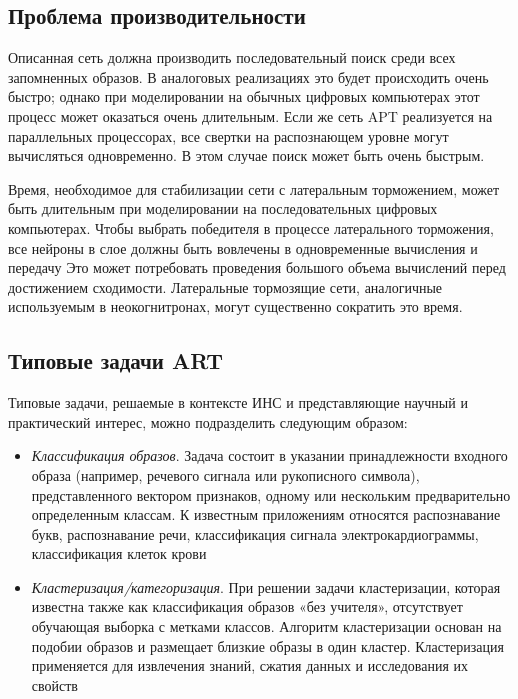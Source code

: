 \documentclass[14pt,a4paper,report]{article}
\begin{document}
\subsection{Проблема производительности}

Описанная сеть должна производить последовательный поиск среди всех запомненных образов. В аналоговых реализациях это будет происходить очень быстро; однако при моделировании на обычных цифровых компьютерах этот процесс может оказаться очень длительным. Если же сеть APT реализуется на параллельных процессорах, все свертки на распознающем уровне могут вычисляться одновременно. В этом случае поиск может быть очень быстрым.

Время, необходимое для стабилизации сети с латеральным торможением, может быть длительным при моделировании на последовательных цифровых компьютерах. Чтобы выбрать победителя в процессе латерального торможения, все нейроны в слое должны быть вовлечены в одновременные вычисления и передачу \cite{cite-scritub-adapt} Это может потребовать проведения большого объема вычислений перед достижением сходимости. Латеральные тормозящие сети, аналогичные используемым в неокогнитронах, могут существенно сократить это время.

\subsection{Типовые задачи ART}

Типовые задачи, решаемые в контексте ИНС и представляющие научный и практический интерес, можно подразделить следующим образом: 

\begin{itemize}
	\item \textit{Классификация образов}. Задача состоит в указании принадлежности входного образа (например, речевого сигнала или рукописного символа), представленного вектором признаков, одному или нескольким предварительно определенным классам. К известным приложениям относятся распознавание букв, распознавание речи, классификация сигнала электрокардиограммы, классификация клеток крови \cite{book-bikanov}
	
	\item \textit{Кластеризация/категоризация}. При решении задачи кластеризации, которая известна также как классификация образов «без учителя», отсутствует обучающая выборка с метками классов. Алгоритм кластеризации основан на подобии образов и размещает близкие образы в один кластер. Кластеризация применяется для извлечения знаний, сжатия данных и исследования их свойств \cite{book-bikanov}
\end{itemize}
\end{document}
